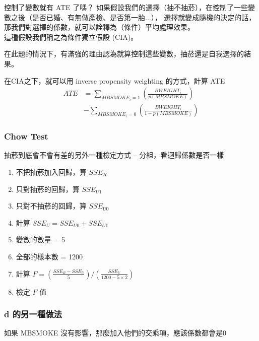 \begin{frame}[plain]
    \begin{alertblock}{控制了變數就有 ATE 了嗎？}
        如果假設我們的選擇（抽不抽菸），在控制了一些變數之後（是否已婚、有無做產檢、是否第一胎...），
        選擇就變成隨機的決定的話，那我們對選擇的係數，就可以詮釋為（條件）平均處理效果。\\
        [2em]
        這種假設我們稱之為條件獨立假設 (CIA)。

        在此題的情況下，有滿強的理由認為就算控制這些變數，抽菸還是自我選擇的結果。
    \end{alertblock}    

    在CIA之下，就可以用 inverse propensity weighting 的方式，計算 ATE 
    \begin{align*}
        ATE &= 
        \sum_{MBSMOKE_i = 1} \left( \frac{BWEIGHT_i}{p(MBSMOKE)} \right) \\
        &- \sum_{MBSMOKE_i = 0} \left( \frac{BWEIGHT_i}{1 - p(MBSMOKE)} \right)
    \end{align*}
\end{frame}

\begin{frame}
    \frametitle{Chow Test}

    抽菸到底會不會有差的另外一種檢定方式 -- 分組，看迴歸係數是否一樣

    \begin{enumerate}
        \item 不把抽菸加入回歸，算 $SSE_{R} $
        \item 只對抽菸的回歸，算 $SSE_{U1}$
        \item 只對不抽菸的回歸，算 $SSE_{U0}$
        \item 計算 $SSE_U = SSE_{U0} + SSE_{U1}$
        \item 變數的數量 = 5
        \item 全部的樣本數 = 1200
        \item 計算 $F = \left(\frac{SSE_R - SSE_U}{5}\right)/\left(\frac{SSE_U}{1200 - 5\times 2}\right)$
        \item 檢定 $F$ 值
    \end{enumerate}
\end{frame}

\begin{frame}
    \frametitle{d 的另一種做法}
    如果 MBSMOKE 沒有影響，那麼加入他們的交乘項，應該係數都會是0

\end{frame}

